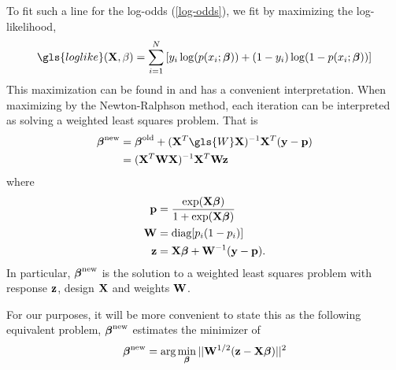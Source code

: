 \documentclass[main.tex]{subfiles}
\begin{document}
To fit such a line for the log-odds (\ref{log-odds}), we fit by maximizing the log-likelihood,
\begin{align}
	\gls{loglike}(\X, \beta) = \sum_{i = 1}^N \left [ y_i \log (p(x_i; \bbeta)) + (1-y_i) \log(1 - p(x_i; \bbeta))\right ] \label{loglikelihood}
\end{align}
This maximization can be found in \cite{elemstatlearn} and has a convenient interpretation. When maximizing by the Newton-Ralphson method, each iteration can be interpreted as solving a weighted least squares problem. That is
\begin{align}
    \bbeta^{\new} &= \bbeta^{\old} + (\X^T \gls{W} \X)^{-1} \X^T(\y - \p) \\
    &= (\X^T \W \X)^{-1} \X^T \W \z
\end{align}
where
\begin{align}
	\mathbf{p} &= \dfrac{\text{exp}(\mathbf{X} \boldsymbol \beta)}{1 + \text{exp}(\mathbf{X} \boldsymbol \beta)} \label{pdef}\\
    \mathbf{W} &= \text{diag}[p_i(1-p_i)] \label{Wdef}\\
    \mathbf{z} &= \mathbf{X} \boldsymbol \beta + \mathbf{W}^{-1}(\mathbf{y} - \mathbf{p}). \label{zdef}
\end{align}
In particular, $\boldsymbol \beta^{\text{new}}$ is the solution to a weighted least squares problem with response $\mathbf{z}$, design $\mathbf{X}$ and weights $\mathbf{W}$.

For our purposes, it will be more convenient to state this as the following equivalent problem,  $\boldsymbol \beta^{\text{new}}$ estimates the minimizer of
\begin{align}
    \boldsymbol \beta^{\text{new}} =  \text{arg} \min_{\boldsymbol \beta} ||\mathbf{W}^{1/2}(\mathbf{z} - \mathbf{X} \boldsymbol \beta)||^2
\end{align}
\end{document}
